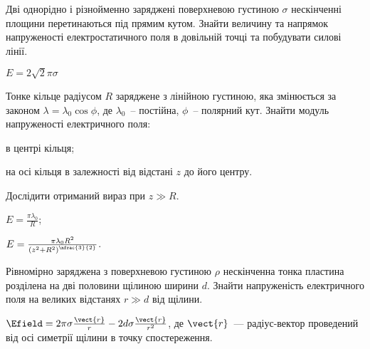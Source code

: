 \begin{problem}
Дві однорідно і різнойменно заряджені поверхневою густиною $\sigma$ нескінченні площини перетинаються під прямим кутом. Знайти величину та напрямок напруженості електростатичного поля в довільній точці та побудувати силові лінії.
\begin{solution}
	$E=2\sqrt{2}\pi\sigma$
\end{solution}
\end{problem}

\begin{problem}
Тонке кільце радіусом $R$ заряджене з лінійною густиною, яка змінюється за законом $\lambda = \lambda_0\cos\phi$, де $\lambda_0$~-- постійна, $\phi$~-- полярний кут. Знайти модуль напруженості електричного
поля:
\begin{enumerate*}[label=\alph*)]
	\item в центрі кільця;
	\item на осі кільця в залежності від відстані $z$ до його
	центру.
\end{enumerate*}
Дослідити отриманий вираз при $z \gg R$.
\begin{solution}
	\begin{enumerate*}[label=\alph*)]
		\item $E = \frac{\pi\lambda_0}{R}$;
		\item $E = \frac{\pi\lambda_0R^2}{\left( z^2 + R^2\right)^{\nfrac{3}{2}}}$.
	\end{enumerate*}
\end{solution}
\end{problem}

\begin{problem}
    Рівномірно заряджена з поверхневою густиною $\rho$ нескінченна тонка пластина розділена на дві половини щілиною ширини $d$. Знайти напруженість електричного поля на великих відстанях $r \gg d$ від щілини.
\begin{solution}
	$\Efield = 2\pi\sigma\frac{\vect{r}}{r} - 2d\sigma\frac{\vect{r}}{r^2}$, де $\vect{r}$~--- радіус-вектор проведений від осі симетрії щілини в точку спостереження.
\end{solution}
\end{problem}


